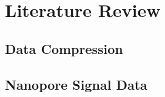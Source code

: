 \chapter{Literature Review} \label{chap:litreview}

\section{Data Compression}









\section{Nanopore Signal Data}




